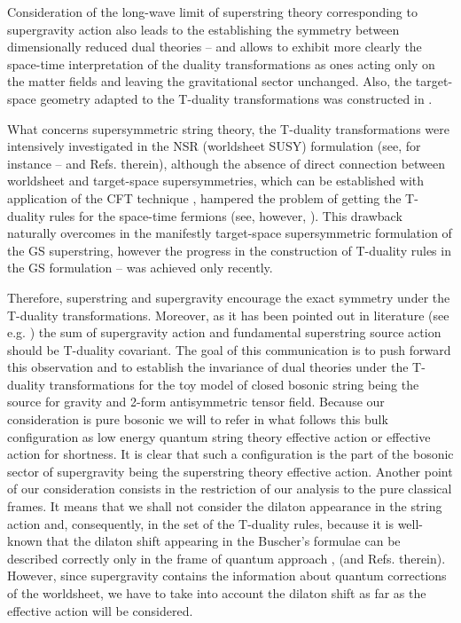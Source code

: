 \documentclass[a4paper,11pt]{article}
\begin{document}
Consideration of the long-wave limit of superstring theory
corresponding to supergravity action also leads to the
establishing the symmetry between dimensionally reduced dual
theories \cite{hw}--\cite{bho} and allows to exhibit more clearly
the space-time interpretation of the duality transformations as
ones acting only on the matter fields and leaving the
gravitational sector unchanged. Also, the target-space geometry
adapted to the T-duality transformations was constructed in
\cite{borlaf}.

What concerns supersymmetric string theory, the T-duality
transformations were intensively investigated in the NSR
(worldsheet SUSY) formulation (see, for instance
\cite{agb}--\cite{abb} and Refs. therein), although
the absence of direct connection between worldsheet and
target-space supersymmetries, which can be established with
application of the CFT technique \cite{bd}, hampered the problem of
getting the T-duality rules for the space-time fermions (see, however, 
\cite{hassan1}). This
drawback naturally overcomes in the manifestly target-space
supersymmetric formulation of the GS superstring, however the
progress in the construction of T-duality rules in the GS
formulation
\cite{clps}--\cite{kr} was achieved only recently.

Therefore, superstring and supergravity encourage the
exact symmetry under the T-duality transformations. Moreover, as it has been
pointed out in literature (see e.g. \cite{t}) the sum of supergravity action 
and fundamental
superstring source action should be T-duality covariant. The goal
of this communication is to push forward this observation and
to establish the invariance of dual
theories under the T-duality transformations for the toy model of
closed bosonic string being the source for gravity and 2-form
antisymmetric tensor field. Because our consideration is pure
bosonic we will to refer in what follows this bulk configuration
as low energy quantum string theory effective action \cite{ft0} or effective
action for shortness. It is clear that such a configuration
is the part of the bosonic sector of supergravity being the superstring theory 
effective action. Another point of our consideration consists in the  
restriction of our analysis
to the pure classical frames. It means that we shall not
consider the dilaton appearance in the string action and, consequently,
in the set of the T-duality rules, because it is 
well-known that the dilaton shift appearing in the Buscher's formulae can be
described correctly only in the frame of quantum approach
\cite{abl}, \cite{jrst} (and Refs. therein). However, since supergravity
contains the information about quantum corrections of the worldsheet, we have 
to take into account the dilaton shift as far as the effective action will be
considered.
\end{document}
